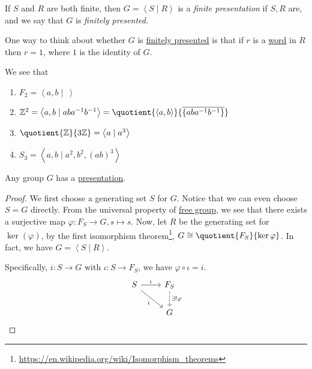 \begin{definition}\label{def:finite-presentation}
	If \(S\) and \(R\) are both finite, then \(G = \left< S \mid R \right> \) is a \emph{finite presentation} if \(S, R\) are, and we say that \(G\) is \emph{finitely presented}.
\end{definition}
\begin{note}
	One way to think about whether \(G\) is \hyperref[def:finite-presentation]{finitely presented} is that if \(r\) is a
	\hyperref[def:word]{word} in \(R\) then \(r = 1\), where \(1\) is the identity of \(G\).
\end{note}

\begin{eg}
	We see that
	\begin{enumerate}[(1)]
		\item \(F_2 = \left< a, b \mid\ \right> \)
		\item \(\mathbb{Z} ^2 = \left< a, b \mid aba^{-1} b^{-1}  \right> = \quotient{\left< a, b \right> }{\overline{\{aba^{-1} b^{-1} \}}} \)
		\item \(\quotient{\mathbb{Z}}{3\mathbb{Z}} = \left< a \mid a^3 \right> \)
		\item \(S_3 = \left< a, b \mid a^2, b^2, (ab)^3 \right> \)
	\end{enumerate}
\end{eg}

\begin{theorem}
	Any group \(G\) has a \hyperref[def:group-presentation]{presentation}.
\end{theorem}
\begin{proof}
	We first choose a generating set \(S\) for \(G\). Notice that we can even choose \(S = G\) directly. From the universal property of \hyperref[def:free-group]{free group},
	we see that there exists a surjective map \(\varphi \colon F_S \to G, s \mapsto s\). Now, let \(R\) be the generating set for \(\ker (\varphi) \),
	by the first isomorphism theorem\footnote{\url{https://en.wikipedia.org/wiki/Isomorphism_theorems}}, \(G\cong \quotient{F_S}{\ker  \varphi}\).
	In fact, we have \(G = \left< S \mid R \right> \).

	Specifically, \(i\colon S\to G\) with \(\iota \colon S\to F_S\), we have \(\varphi \circ \iota = i\).
	\[
		\begin{tikzcd}
			S \ar[rd, "i"']\ar[r, "\iota "] & F_S\ar[d, dashed, "\exists !\varphi"]\\
			& G
		\end{tikzcd}
	\]
\end{proof}

